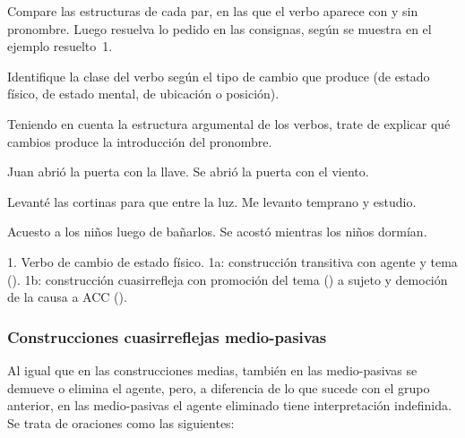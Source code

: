 \begin{ejercicio}\label{ej:10-cambio}
Compare las estructuras de cada par, en las que el verbo aparece con y sin
pronombre. Luego resuelva lo pedido en las consignas, según se muestra en el
ejemplo resuelto~1.

\begin{consignas}
  \item Identifique la clase del verbo según el tipo de cambio que produce (de
        estado físico, de estado mental, de ubicación o posición).
  \item Teniendo en cuenta la estructura argumental de los verbos, trate de
        explicar qué cambios produce la introducción del pronombre.
\end{consignas}

\begin{exe}
  \ex
    \begin{xlist}
      \ex Juan abrió la puerta con la llave.
      \ex Se abrió la puerta con el viento.
    \end{xlist}
  \ex
    \begin{xlist}
      \ex Levanté las cortinas para que entre la luz.
      \ex Me levanto temprano y estudio.
    \end{xlist}
  \ex
    \begin{xlist}
      \ex Acuesto a los niños luego de bañarlos.
      \ex Se acostó mientras los niños dormían.
    \end{xlist}
\end{exe}

\begin{resuelto}
1. Verbo de cambio de estado físico. 1a: construcción transitiva con agente y
tema (). 1b: construcción cuasirrefleja con promoción del tema
() a sujeto y democión de la causa a ACC ().
\end{resuelto}
\end{ejercicio}

\subsubsection{Construcciones cuasirreflejas medio-pasivas}\label{sec:10-mediopasivas}

Al igual que en las construcciones medias, también en las medio-pasivas se
demueve o elimina el agente, pero, a diferencia de lo que sucede con el grupo
anterior, en las medio-pasivas el agente eliminado tiene interpretación
indefinida. Se trata de oraciones como las siguientes:

